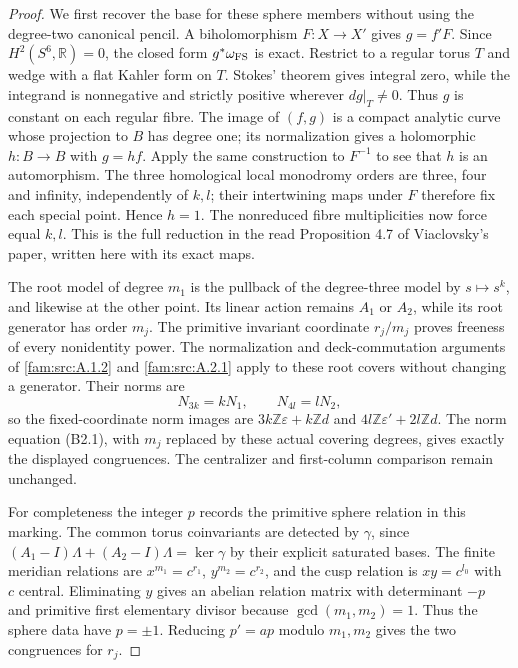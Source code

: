 \begin{proof}
We first recover the base for these sphere members without using the degree-two canonical pencil. A biholomorphism $F:X\to X'$ gives $g=f'F$. Since $H^2(S^6,\mathbb R)=0$, the closed form $g^*\omega_{\rm FS}$ is exact. Restrict to a regular torus $T$ and wedge with a flat Kahler form on $T$. Stokes' theorem gives integral zero, while the integrand is nonnegative and strictly positive wherever $dg|_T\ne0$. Thus $g$ is constant on each regular fibre. The image of $(f,g)$ is a compact analytic curve whose projection to $B$ has degree one; its normalization gives a holomorphic $h:B\to B$ with $g=hf$. Apply the same construction to $F^{-1}$ to see that $h$ is an automorphism. The three homological local monodromy orders are three, four and infinity, independently of $k,l$; their intertwining maps under $F$ therefore fix each special point. Hence $h=1$. The nonreduced fibre multiplicities now force equal $k,l$. This is the full reduction in the read Proposition 4.7 of Viaclovsky's paper, written here with its exact maps.

The root model of degree $m_1$ is the pullback of the degree-three model by $s\mapsto s^k$, and likewise at the other point. Its linear action remains $A_1$ or $A_2$, while its root generator has order $m_j$. The primitive invariant coordinate $r_j/m_j$ proves freeness of every nonidentity power. The normalization and deck-commutation arguments of \ref{fam:src:A.1.2} and \ref{fam:src:A.2.1} apply to these root covers without changing a generator. Their norms are
\[
 N_{3k}=kN_1,\qquad N_{4l}=lN_2,
\]
so the fixed-coordinate norm images are $3k\mathbb Z\varepsilon+k\mathbb Zd$ and $4l\mathbb Z\varepsilon'+2l\mathbb Zd$. The norm equation (B2.1), with $m_j$ replaced by these actual covering degrees, gives exactly the displayed congruences. The centralizer and first-column comparison remain unchanged.

For completeness the integer $p$ records the primitive sphere relation in this marking. The common torus coinvariants are detected by $\gamma$, since $(A_1-I)\Lambda+(A_2-I)\Lambda=\ker\gamma$ by their explicit saturated bases. The finite meridian relations are $x^{m_1}=c^{r_1}$, $y^{m_2}=c^{r_2}$, and the cusp relation is $xy=c^{l_0}$ with $c$ central. Eliminating $y$ gives an abelian relation matrix with determinant $-p$ and primitive first elementary divisor because $\gcd(m_1,m_2)=1$. Thus the sphere data have $p=\pm1$. Reducing $p'=ap$ modulo $m_1,m_2$ gives the two congruences for $r_j$.


\end{proof}
